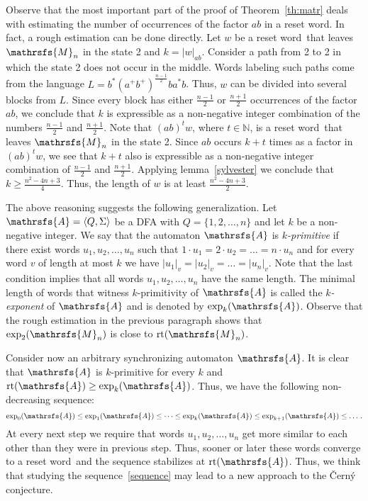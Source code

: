 \documentclass[11pt]{llncs}
\newcommand{\sw}{reset word}
\DeclareMathOperator{\rt}{rt}
\begin{document}
Observe that the most important part of the proof of Theorem~\ref{th:matr}
deals with estimating the number of occurrences of the factor $ab$ in a reset
word. In fact, a rough estimation can be done directly. Let $w$ be a \sw\ that
leaves $\mathrsfs{M}_n$ in the state 2 and $k=|w|_{ab}$. Consider a path from 2
to 2 in which the state 2 does not occur in the middle. Words labeling such
paths come from the language $L=b^*(a^+b^+)^{\frac{n - 1}{2}}ba^*b$. Thus, $w$
can be divided into several blocks from $L$. Since every block has either
$\frac{n - 1}{2}$ or $\frac{n+1}{2}$ occurrences of the factor $ab$, we
conclude that $k$ is expressible as a non-negative integer combination of the
numbers $\frac{n-1}{2}$ and $\frac{n+1}{2}$. Note that $(ab)^tw$, where $t \in
\mathbb{N}$, is a \sw\ that leaves $\mathrsfs{M}_n$ in the state 2. Since $ab$
occurs $k + t$ times as a factor in $(ab)^tw$, we see that $k + t$ also is
expressible as a non-negative integer combination of $\frac{n-1}{2}$ and
$\frac{n+1}{2}$. Applying lemma~\ref{sylvester} we conclude that $k \geq
\frac{n^2 - 4n + 3}{4}$. Thus, the length of $w$ is at least $\frac{n^2 - 4n +
3}{2}$.

The above reasoning  suggests the following generalization. Let $\mathrsfs{A} =
\langle Q, \Sigma \rangle$ be a DFA with $Q=\{1,2,\dots,n\}$ and let $k$ be a
non-negative integer. We say that the automaton $\mathrsfs{A}$ is
\emph{$k$-primitive} if there exist words $u_1,u_2,\dots,u_n$ such that $1\cdot
u_1=2\cdot u_2=\dots=n\cdot u_n$ and for every word $v$ of length at most $k$
we have $|u_1|_v = |u_2|_v = \ldots = |u_n|_v$. Note that the last condition
implies that all words $u_1,u_2,\dots,u_n$ have the same length. The minimal
length of words that witness $k$-primitivity of  $\mathrsfs{A}$ is called the
\emph{$k$-exponent} of $\mathrsfs{A}$ and is denoted by $\exp_k(\mathrsfs{A})$.
Observe that the rough estimation in the previous paragraph shows that
$\exp_2(\mathrsfs{M}_n)$ is close to $\rt(\mathrsfs{M}_n)$.

Consider now an arbitrary synchronizing automaton $\mathrsfs{A}$. It is clear
that $\mathrsfs{A}$ is $k$-primitive for every $k$  and $\rt(\mathrsfs{A}) \geq
\exp_k(\mathrsfs{A})$. Thus, we have the following non-decreasing sequence:
\begin{equation}
\label{sequence}
\exp_0(\mathrsfs{A}) \leq \exp_1(\mathrsfs{A}) \leq \dots \leq
\exp_k(\mathrsfs{A}) \leq \exp_{k + 1}(\mathrsfs{A}) \leq \dotsc.
\end{equation}
At every next step we require that words $u_1,u_2,\dots,u_n$ get more similar
to each other than they were in previous step. Thus, sooner or later these
words converge to a \sw\ and the sequence stabilizes at $\rt(\mathrsfs{A})$.
Thus, we think that studying the sequence~\eqref{sequence} may lead to a new
approach to the \v{C}ern\'{y} conjecture.
\end{document}

